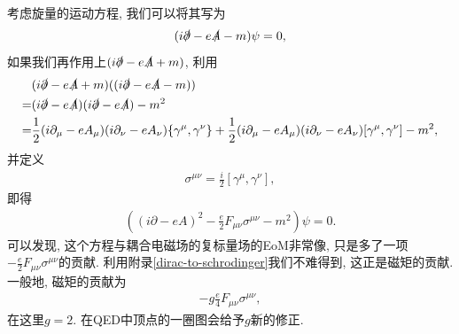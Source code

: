 考虑旋量的运动方程, 我们可以将其写为
\begin{align}
    (i\slashed\partial-e\slashed A-m)\psi=0,
\end{align}
如果我们再作用上$(i\slashed\partial-e\slashed A+m)$, 利用
\begin{align}
    &(i\slashed\partial-e\slashed A+m)((i\slashed\partial-e\slashed A-m))\notag\\
    =&(i\slashed\partial-e\slashed A)(i\slashed\partial-e\slashed A)-m^2\notag\\
    =&\frac12(i\partial_\mu-eA_\mu)(i\partial_\nu-eA_\nu)\{\gamma^\mu, \gamma^\nu\}+\frac12(i\partial_\mu-eA_\mu)(i\partial_\nu-eA_\nu)[\gamma^\mu, \gamma^\nu]-m^2,
\end{align}
并定义
\begin{align}
    \sigma^{\mu\nu}=\frac i2[\gamma^\mu, \gamma^\nu],
\end{align}
即得
\begin{align}
    \left((i\partial-eA)^2-\frac e2F_{\mu\nu}\sigma^{\mu\nu}-m^2\right)\psi=0.
\end{align}
可以发现, 这个方程与耦合电磁场的复标量场的EoM非常像, 只是多了一项$-\frac e2F_{\mu\nu}\sigma^{\mu\nu}$的贡献. 利用附录\ref{dirac-to-schrodinger}我们不难得到, 这正是磁矩的贡献. 一般地, 磁矩的贡献为
\begin{align}
    -g\frac e4F_{\mu\nu}\sigma^{\mu\nu},
\end{align}
在这里$g=2$. 在QED中顶点的一圈图会给予$g$新的修正.

